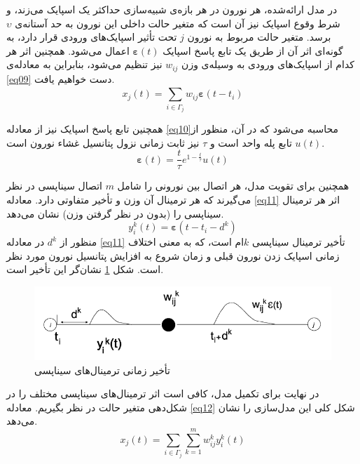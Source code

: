 \documentclass[a4paper]{article}
\begin{document}
در مدل ارائه‌شده، هر نورون در هر بازه‌ی شبیه‌سازی حداکثر یک اسپایک می‌زند، و شرط وقوع اسپایک نیز آن است که متغیر حالت داخلی این نورون به حد آستانه‌ی $\upsilon$ برسد. متغیر حالت مربوط به نورون $j$ تحت تأثیر اسپایک‌های ورودی قرار دارد، به گونه‌ای اثر آن از طریق یک تابع پاسخ اسپایک $\boldsymbol{\varepsilon}(t)$ اعمال می‌شود. همچنین  اثر هر کدام از اسپایک‌های ورودی به وسیله‌ی وزن $w_{ij}$ نیز تنظیم می‌شود، بنابراین به معادله‌ی \ref{eq09} دست خواهیم یافت.
\begin{equation}
x_j(t)=\sum_{i\in\Gamma_j}^{}w_{ij}\boldsymbol{\varepsilon}(t-t_i)
\label{eq09}
\end{equation}

همچنین تابع پاسخ اسپایک نیز از معادله  \ref{eq10}محاسبه می‌شود که در آن، منظور از $u(t)$ تابع پله واحد است و $\tau$ نیز ثابت زمانی نزول پتانسیل غشاء نورون است.
\begin{equation}
\boldsymbol{\varepsilon}(t)=\frac{t}{\tau}e^{1-\frac{t}{\tau}}u(t)
\label{eq10}
\end{equation}

همچنین برای تقویت مدل، هر اتصال بین نورونی را شامل $m$ اتصال سیناپسی در نظر می‌گیرند که هر ترمینال آن وزن و تأخیر متفاوتی دارد. معادله \ref{eq11} اثر هر ترمینال سیناپسی را (بدون در نظر گرفتن وزن) نشان می‌دهد.
\begin{equation}
y_i^k(t)=\boldsymbol{\varepsilon}(t-t_i-d^k)
\label{eq11}
\end{equation}
منظور از $d^k$ در معادله \ref{eq11} تأخیر ترمینال سیناپسی $k$ام است، که به معنی اختلاف زمانی اسپایک زدن نورون قبلی و زمان شروع به افزایش پتانسیل نورون مورد نظر است. شکل \ref{fig05} نشان‌گر این تأخیر است.
\begin{figure}[h!]
	\centering
	\includegraphics[scale=0.5]{fig05.png}
	\caption{تأخیر زمانی ترمینال‌های سیناپسی}
	\label{fig05}
\end{figure}

در نهایت برای تکمیل مدل، کافی است  اثر ترمینال‌های سیناپسی مختلف را در شکل‌دهی متغیر حالت در نظر بگیریم. معادله \ref{eq12} شکل کلی این مدل‌سازی را نشان می‌دهد.
\begin{equation}
x_j(t)=\sum_{i\in\Gamma_j}^{}\sum_{k=1}^{m}w^k_{ij}y^k_i(t)
\label{eq12}
\end{equation}
\end{document}
